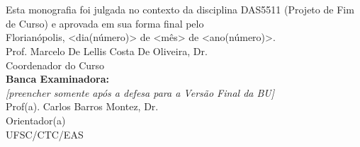 \imprimircapa

\imprimirfolhaderosto*

\begin{fichacatalografica}
	
\end{fichacatalografica}

\begin{folhadeaprovacao}
	\OnehalfSpacing
	\centering
	\imprimirautor\\%
	\vspace*{10pt}		
	\textbf{\imprimirtitulo}%
	\ifnotempty{\imprimirsubtitulo}{:~\imprimirsubtitulo}\\%
	\vspace*{\baselineskip}
	
	Esta monografia foi julgada no contexto da disciplina DAS5511 (Projeto de Fim de Curso) e aprovada em sua forma final pelo \imprimircurso\\
	\vspace*{\baselineskip}
	Florianópolis, <dia(número)> de <mês> de <ano(número)>.\\
	
	
	\vspace*{2\baselineskip}
	Prof. Marcelo De Lellis Costa De Oliveira, Dr.\\
	Coordenador do Curso\\
	
	\vspace*{\baselineskip}
	\textbf{Banca Examinadora:} \\ \emph{[preencher somente após a defesa para a Versão Final da BU]} \\
	
	
	\vspace*{2\baselineskip}
	Prof(a). Carlos Barros Montez, Dr.\\
	Orientador(a) \\
	UFSC/CTC/EAS\\
	

\end{folhadeaprovacao}

